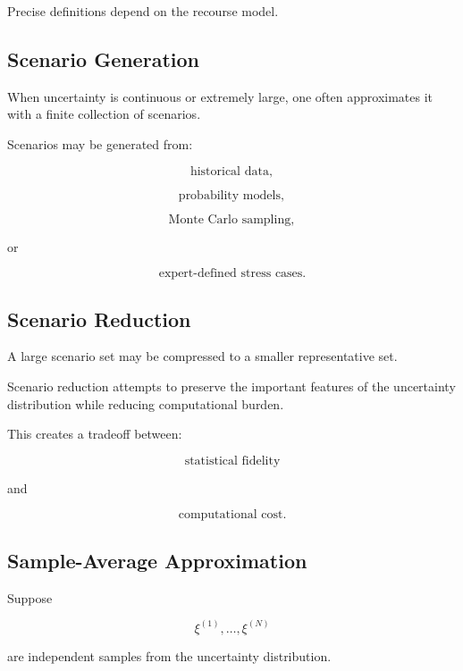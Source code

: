 Precise definitions depend on the recourse model.

\subsection{Scenario Generation}
\label{subsec:scenario-generation}

When uncertainty is continuous or extremely large, one often approximates
it with a finite collection of scenarios.

Scenarios may be generated from:

\[
\boxed{
\text{historical data},
}
\]

\[
\boxed{
\text{probability models},
}
\]

\[
\boxed{
\text{Monte Carlo sampling},
}
\]

or

\[
\boxed{
\text{expert-defined stress cases}.
}
\]

\subsection{Scenario Reduction}
\label{subsec:scenario-reduction}

A large scenario set may be compressed to a smaller representative set.

Scenario reduction attempts to preserve the important features of the
uncertainty distribution while reducing computational burden.

This creates a tradeoff between:

\[
\boxed{
\text{statistical fidelity}
}
\]

and

\[
\boxed{
\text{computational cost}.
}
\]

\subsection{Sample-Average Approximation}
\label{subsec:sample-average-approximation}

Suppose

\[
\xi^{(1)},
\ldots,
\xi^{(N)}
\]

are independent samples from the uncertainty distribution.

